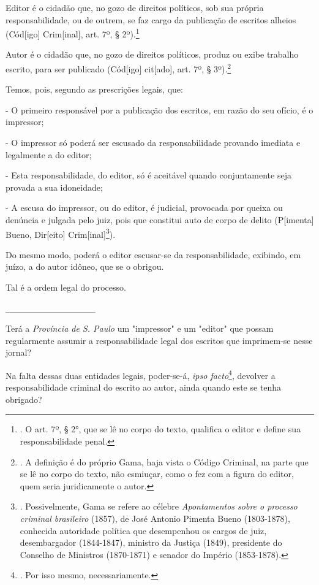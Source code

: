 Editor é o cidadão que, no gozo de direitos políticos, sob sua própria
responsabilidade, ou de outrem, se faz cargo da publicação de escritos
alheios (Cód{[}igo{]} Crim{[}inal{]}, art. 7º, § 2º).\footnote{. O art.
  7º, § 2°, que se lê no corpo do texto, qualifica o editor e define sua
  responsabilidade penal.}

Autor é o cidadão que, no gozo de direitos políticos, produz ou exibe
trabalho escrito, para ser publicado (Cód{[}igo{]} cit{[}ado{]}, art.
7º, § 3º).\footnote{. A definição é do próprio Gama, haja vista o Código
  Criminal, na parte que se lê no corpo do texto, não esmiuçar, como o
  fez com a figura do editor, quem seria juridicamente o autor.}

Temos, pois, segundo as prescrições legais, que:

- O primeiro responsável por a publicação dos escritos, em razão do seu
ofício, é o impressor;

- O impressor só poderá ser escusado da responsabilidade provando
imediata e legalmente a do editor;

- Esta responsabilidade, do editor, só é aceitável quando conjuntamente
seja provada a sua idoneidade;

- A escusa do impressor, ou do editor, é judicial, provocada por queixa
ou denúncia e julgada pelo juiz, pois que constitui auto de corpo de
delito (P{[}imenta{]} Bueno, Dir{[}eito{]} Crim{[}inal{]}\footnote{.
  Possivelmente, Gama se refere ao célebre \emph{Apontamentos sobre o
  processo criminal brasileiro} (1857), de José Antonio Pimenta Bueno
  (1803-1878), conhecida autoridade política que desempenhou os cargos
  de juiz, desembargador (1844-1847), ministro da Justiça (1849),
  presidente do Conselho de Ministros (1870-1871) e senador do Império
  (1853-1878).}).

Do mesmo modo, poderá o editor escusar-se da responsabilidade, exibindo,
em juízo, a do autor idôneo, que se o obrigou.

Tal é a ordem legal do processo.

\_\_\_\_\_\_\_\_\_\_\_\_\_\_

Terá a \emph{Província de S. Paulo} um "impressor" e um "editor" que
possam regularmente assumir a responsabilidade legal dos escritos que
imprimem-se nesse jornal?

Na falta dessas duas entidades legais, poder-se-á, \emph{ipso
facto}\footnote{. Por isso mesmo, necessariamente.}, devolver a
responsabilidade criminal do escrito ao autor, ainda quando este se
tenha obrigado?

